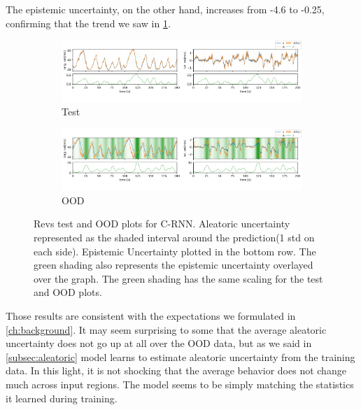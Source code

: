 The epistemic uncertainty, on the other hand, increases from -4.6 to -0.25, confirming that the trend we saw in \cref{fig:Revs_run}.

\begin{figure}[htbp]
  \centering
  
  \begin{subfigure}[b]{\textwidth}
    \includegraphics[width=\textwidth]{Experiments/figs/revs_test.png}
    \caption{Test}
  \end{subfigure}
  
  \begin{subfigure}[b]{\textwidth}
    \includegraphics[width=\textwidth]{Experiments/figs/revs_ood.png}
    \caption{OOD}
  \end{subfigure}
  
  \caption[Revs prediction plots for C-RNN]{Revs test and OOD plots for C-RNN. Aleatoric uncertainty represented as the shaded interval around the prediction(1 std on each side). Epistemic Uncertainty plotted in the bottom row. The green shading also represents the epistemic uncertainty overlayed over the graph. The green shading has the same scaling for the test and OOD plots.}
  \label{fig:Revs_run}
\end{figure}


Those results are consistent with the expectations we formulated in \cref{ch:background}. It may seem surprising to some that the average aleatoric uncertainty does not go up at all over the OOD data, but as we said in \cref{subsec:aleatoric} model learns to estimate aleatoric uncertainty from the training data. In this light, it is not shocking that the average behavior does not change much across input regions. The model seems to be simply matching the statistics it learned during training. 

